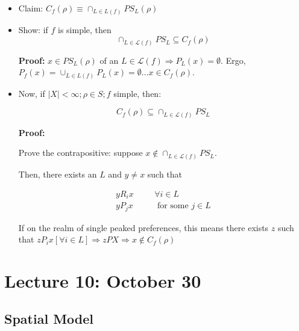 \documentclass{article}
\newcommand{\Lm}{\mathcal{L}}
\newcommand{\core}{C_{f}(\rho)}
\begin{document}
\begin{itemize}

\item Claim: $\core \equiv \cap_{L\in L(f)} PS_L(\rho) $


\item Show: if $f$ is simple, then 
\[
\cap_{L\in \Lm(f)} PS_L \subseteq C_f(\rho)
\]

\textbf{Proof:}
 $x \in PS_L(\rho)$ of an $L\in \Lm(f) \Rightarrow P_L(x) = \emptyset$. Ergo, $P_f(x) =  \cup_{L\in L(f)} P_L(x) = \emptyset \dots x\in\core$.
 \item Now, if $|X| < \infty; \rho \in S ; f$ simple, then:

\[
C_f(\rho) \subseteq \cap_{L\in \Lm(f)} PS_L 
\]

\textbf{Proof:}

Prove the contrapositive: suppose $x \not \in \cap_{L\in \Lm(f)} PS_L$.

Then, there exists an $L$ and $y \neq x$ such that 

\begin{align*}
yR_ix \;\;\;\;\;\;&\forall i\in L\\
yP_jx \;\;\;\;\;\;&\text{ for some } j\in L
\end{align*}

If on the realm of single peaked preferences, this means there exists $z$ such that $zP_i x [\forall i \in L] \Rightarrow zPX \Rightarrow x \not \in \core$
\end{itemize}
\section*{Lecture 10: October 30}
\subsection*{Spatial Model}
\end{document}
